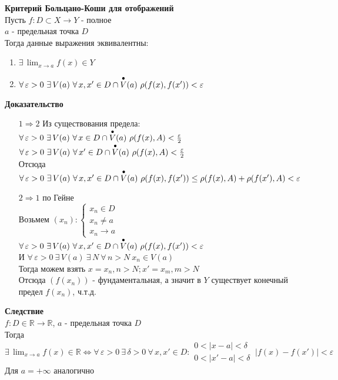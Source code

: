 \documentclass[12pt]{article}
\begin{document}
\textbf{Критерий Больцано-Коши для отображений}\\
Пусть $f:D\subset X \rightarrow Y$ - полное\\
$a$ - предельная точка $D$\\
Тогда данные выражения эквивалентны:
\begin{enumerate}
    \item $\exists\, \lim_{x\rightarrow a}f(x) \in Y$
    \item $\forall\,\varepsilon>0\ \exists\,V(a)\ \forall\,x,x' \in D \cap \overdot{V}(a)\ \rho(f(x),f(x')) < \varepsilon$
\end{enumerate}
\textbf{Доказательство}
\begin{enumerate}
    \item[$1 \Rightarrow 2$] Из существования предела:\\
    $\forall\,\varepsilon>0\ \exists\,V(a)\ \forall\,x \in D \cap \overdot{V}(a)\ \rho(f(x),A) < \frac\varepsilon2$\\
    $\forall\,\varepsilon>0\ \exists\,V(a)\ \forall\,x' \in D \cap \overdot{V}(a)\ \rho(f(x),A) < \frac\varepsilon2$\\
    Отсюда $\forall\,\varepsilon>0\ \exists\,V(a)\ \forall\,x,x' \in D \cap \overdot{V}(a)\ \rho(f(x),f(x')) \leq \rho(f(x),A)+\rho(f(x'),A) < \varepsilon$
    \item[$2 \Rightarrow 1$] по Гейне\\
    Возьмем $(x_n): \left\{\begin{array}{l}
         x_n\in D\\
         x_n \neq a\\
         x_n \rightarrow a
    \end{array}\right.$\\
    $\forall\,\varepsilon>0\ \exists\,V(a)\ \forall\,x,x' \in D \cap \overdot{V}(a)\ \rho(f(x),f(x')) < \varepsilon$\\
    И $\forall\,\varepsilon>0\ \exists\,V(a)\ \exists\,N\ \forall\,n>N\ x_n\in V(a)$\\
    Тогда можем взять $x=x_n, n > N; x' = x_m, m > N$\\
    Отсюда $(f(x_n))$ - фундаментальная, а значит в $Y$ существует конечный предел $f(x_n)$, ч.т.д.
\end{enumerate}
\textbf{Следствие}\\
$f:D\in\mathbb{R}\rightarrow \mathbb{R}$, $a$ - предельная точка $D$\\
Тогда $\exists\,\lim_{x\rightarrow a}f(x) \in \mathbb{R} \Leftrightarrow \forall\,\varepsilon>0\ \exists\,\delta>0\ \forall\,x,x'\in D: \begin{array}{l}
     0 < |x-a|<\delta\\
     0 < |x'-a| < \delta
\end{array}\ |f(x)-f(x')| < \varepsilon$\\
Для $a=+\infty$ аналогично
\end{document}
